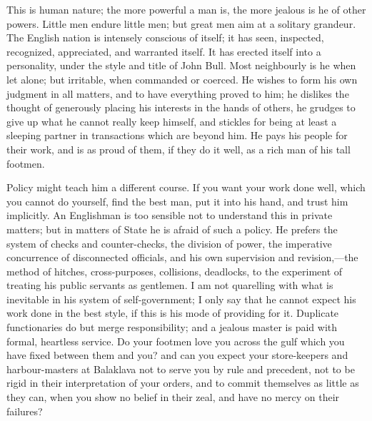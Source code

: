 This is human nature; the more powerful a man is,
the more jealous is he of other powers. Little men endure little men;
but great men aim at a solitary grandeur. The English nation is
intensely conscious of itself; it has seen, inspected, recognized,
appreciated, and warranted itself. It has erected itself into a
personality, under the style and title of John Bull. Most neighbourly
is he when let alone; but irritable, when commanded or coerced. He
wishes to form his own judgment in all matters, and to have everything
proved to him; he dislikes the thought of generously placing his
interests in the hands of others, he grudges to give up what he cannot
really keep himself, and stickles for being at least a sleeping
partner in transactions which are beyond him. He pays his people for
their work, and is as proud of them, if they do it well, as a rich man
of his tall footmen.

Policy might teach him a different course. If you
want your work done well, which you cannot do yourself, find the best
man, put it into his hand, and trust him implicitly. An Englishman is
too sensible not to understand this in private matters; but in matters
of State he is afraid of such a policy. He prefers the system of
checks and counter-checks, the division of power, the imperative
concurrence of disconnected officials, and his own supervision and
revision,—the method of hitches, cross-purposes, collisions,
deadlocks, to the experiment of treating his public servants as
gentlemen. I am not quarelling with what is inevitable in his system
of self-government; I only say that he cannot expect his work done in
the best style, if this is his mode of providing for it. Duplicate
functionaries do but merge responsibility; and a jealous master is
paid with formal, heartless service. Do your footmen love you across
the gulf which you have fixed between them and you? and can you expect
your store-keepers and harbour-masters at Balaklava not to serve you
by rule and precedent, not to be rigid in their interpretation of your
orders, and to commit themselves as little as they can, when you show
no belief in their zeal, and have no mercy on their failures?

